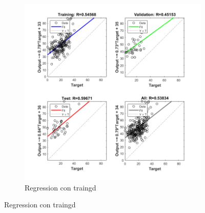 \documentclass[a4paper, 12pt]{article}
\begin{document}
\begin{figure}[htp!]
\begin{subfigure}{0.49\textwidth}
                        \includegraphics[width=\textwidth]{figures/parte1/Ej3/Ej3_regression_traingd.png}
                        \caption{Regression con traingd}
                    \end{subfigure}
                \end{figure}

            
            \newpage
\end{document}
